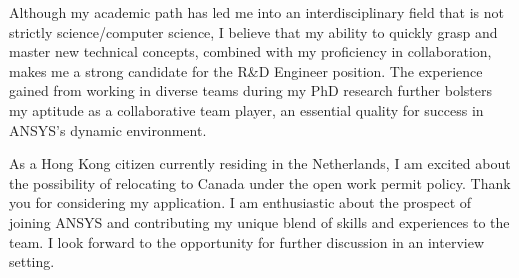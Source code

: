 \documentclass[11pt, a4paper]{awesome-cv}
\begin{document}
\begin{cvletter}
Although my academic path has led me into an interdisciplinary field that is not strictly science/computer science, I believe that my ability to quickly grasp and master new technical concepts, combined with my proficiency in collaboration, makes me a strong candidate for the R\&D Engineer position. The experience gained from working in diverse teams during my PhD research further bolsters my aptitude as a collaborative team player, an essential quality for success in ANSYS's dynamic environment.

As a Hong Kong citizen currently residing in the Netherlands, I am excited about the possibility of relocating to Canada under the open work permit policy. Thank you for considering my application. I am enthusiastic about the prospect of joining ANSYS and contributing my unique blend of skills and experiences to the team. I look forward to the opportunity for further discussion in an interview setting.


\end{cvletter}


\makeletterclosing
\end{document}
